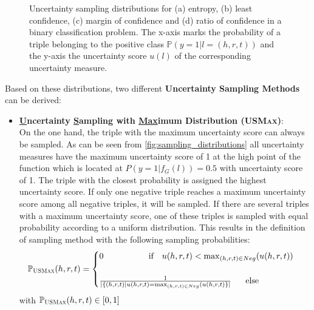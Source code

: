 \begin{figure}
\begin{minipage}{.5\textwidth}
    \end{minipage}%
    \caption{Uncertainty sampling distributions for (a) entropy, (b) least confidence, (c) margin of confidence and (d) ratio of confidence in a binary classification problem.
    The x-axis marks the probability of a triple belonging to the positive class $\mathbb{P}(y = 1 | l = (h,r,t))$ and the y-axis the uncertainty score $u(l)$ of the corresponding uncertainty measure.}
    \label{fig:sampling_distributions}
\end{figure}

Based on these distributions, two different \textbf{Uncertainty Sampling Methods} can be derived:
\begin{itemize}
    \item 
    \textbf{\underline{U}ncertainty \underline{S}ampling with \underline{Max}imum Distribution (\textsc{USMax})}:\\
    On the one hand, the triple with the maximum uncertainty score can always be sampled.
    As can be seen from \autoref{fig:sampling_distributions} all uncertainty measures have the maximum uncertainty score of 1 at the high point of the function which is located at $P(y = 1 | f_G(l)) = 0.5$ with uncertainty score of 1.
    The triple with the closest probability is assigned the highest uncertainty score.
    If only one negative triple reaches a maximum uncertainty score among all negative triples, it will be sampled.
    If there are several triples with a maximum uncertainty score, one of these triples is sampled with equal probability according to a uniform distribution.
    This results in the definition of sampling method \usmax with the following sampling probabilities:
    \begin{equation} 
        \mathbb{P}_{\usmax}(h, r, t) =
        \begin{cases}
             0 \ \ \ \ \ \  \ \ \ \ \ \ \ \  \ \ 
             \text{if}\ \ \ u(h, r, t) < \max_{(h,r,t) \in Neg}(u(h, r, t)) 
             \\ \\
            \frac{1}{|\{(h,r,t) | u(h,r,t) = \max_{(h,r,t) \in Neg}(u(h, r, t)\}|} 
            \ \ \ \ \
            \text{else} 
             \\
        \end{cases}
         \label{eq:usmax}
    \end{equation}
    with $\mathbb{P}_{\textsc{USMax}}(h, r, t) \in [0,1]$ 
    

\end{itemize}
